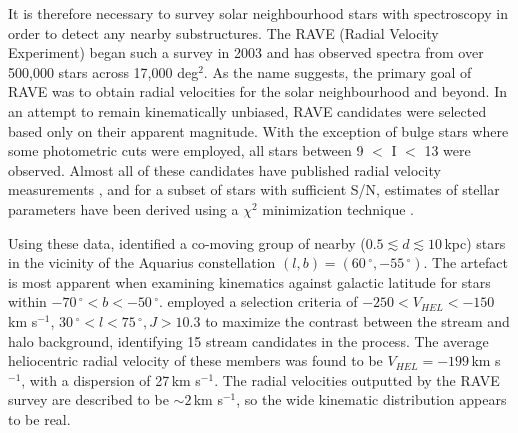 \documentclass{emulateapj}
\begin{document}
It is therefore necessary to survey solar neighbourhood stars with spectroscopy in order to detect any nearby substructures. The RAVE (Radial Velocity Experiment) began such a survey in 2003 and has observed spectra from over 500,000 stars across 17,000 deg$^{2}$. As the name suggests, the primary goal of RAVE was to obtain radial velocities for the solar neighbourhood and beyond. In an attempt to remain kinematically unbiased, RAVE candidates were selected based only on their apparent magnitude. With the exception of bulge stars where some photometric cuts were employed, all stars between 9 $<$ I $<$ 13 were observed. Almost all of these candidates have published radial velocity measurements \citep{steinmetz;et-al_2006}, and for a subset of stars with sufficient S/N, estimates of stellar parameters have been derived using a $\chi^2$ minimization technique \citep{zwitter;et-al_2008, siebert;et-al_2011}. 

Using these data, \citet{williams;et-al_2011} identified a co-moving group of nearby ($0.5 \lesssim d \lesssim 10$\,kpc) stars in the vicinity of the Aquarius constellation $(l, b) = (60\,^\circ, -55\,^\circ)$. The artefact is most apparent when examining kinematics against galactic latitude for stars within $-70\,^\circ < b < -50\,^\circ$. \citet{williams;et-al_2011} employed a selection criteria of $-250 < V_{HEL} < -150$\,km s$^{-1}$, $30\,^\circ < l < 75\,^\circ, J > 10.3$ to maximize the contrast between the stream and halo background, identifying 15 stream candidates in the process. The average heliocentric radial velocity of these members was found to be $V_{HEL} = -199$\,km s$^{-1}$, with a dispersion of 27\,km s$^{-1}$. The radial velocities outputted by the RAVE survey are described to be $\sim2$\,km s$^{-1}$, so the wide kinematic distribution appears to be real.

\end{document}
